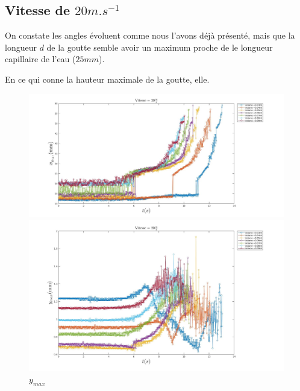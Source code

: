\documentclass[french]{article}
\begin{document}
\newpage
\subsection{Vitesse de $20m.s^{-1}$}

On constate les angles évoluent comme nous l'avons déjà présenté, mais que la longueur $d$ de la goutte semble avoir un maximum proche de le longueur capillaire de l'eau ($25 mm$).

En ce qui conne la hauteur maximale de la goutte, elle.
\begin{figure}[!h]
	\centering
	\begin{minipage}{0.95\linewidth}
	\includegraphics[width = \linewidth]{./image/v=20xm.jpg}
	\caption{$x_{max}$}
		\label{fig:v=20xm}
	\end{minipage}
	\begin{minipage}{0.95\linewidth}
	\includegraphics[width = \linewidth]{./image/v=20ym.jpg}
	\caption{$y_{max}$}
		\label{fig:v=20ym}
	\end{minipage}
\end{figure}
\end{document}
